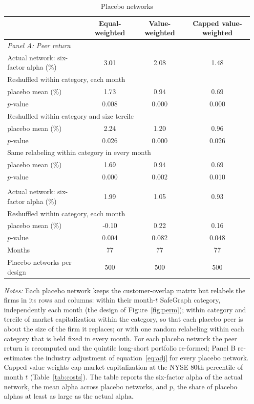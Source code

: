 \begin{table}[!htbp]\centering
\caption{Placebo networks}\label{tab:placebo}
\footnotesize
\begin{tabular*}{\linewidth}{@{\extracolsep{\fill}}lccc}
\toprule
 & Equal-weighted & Value-weighted & Capped value-weighted \\
\midrule
\multicolumn{4}{l}{\emph{Panel A: Peer return}} \\
Actual network: six-factor alpha (\%) & 3.01 & 2.08 & 1.48 \\
\multicolumn{4}{l}{Reshuffled within category, each month} \\
\quad placebo mean (\%) & 1.73 & 0.94 & 0.69 \\
\quad $p$-value & 0.008 & 0.000 & 0.000 \\
\multicolumn{4}{l}{Reshuffled within category and size tercile} \\
\quad placebo mean (\%) & 2.24 & 1.20 & 0.96 \\
\quad $p$-value & 0.026 & 0.000 & 0.026 \\
\multicolumn{4}{l}{Same relabeling within category in every month} \\
\quad placebo mean (\%) & 1.69 & 0.94 & 0.69 \\
\quad $p$-value & 0.000 & 0.002 & 0.010 \\
\addlinespace
\multicolumn{4}{l}{\emph{Panel B: Industry-adjusted peer return}} \\
Actual network: six-factor alpha (\%) & 1.99 & 1.05 & 0.93 \\
\multicolumn{4}{l}{Reshuffled within category, each month} \\
\quad placebo mean (\%) & -0.10 & 0.22 & 0.16 \\
\quad $p$-value & 0.004 & 0.082 & 0.048 \\
\addlinespace
Months & 77 & 77 & 77 \\
Placebo networks per design & 500 & 500 & 500 \\
\bottomrule
\end{tabular*}
\par\vspace{4pt}\begin{minipage}{\linewidth}\scriptsize \emph{Notes:} Each placebo network keeps the customer-overlap matrix but relabels the firms in its rows and columns: within their month-$t$ SafeGraph category, independently each month (the design of Figure~\ref{fig:perm}); within category and tercile of market capitalization within the category, so that each placebo peer is about the size of the firm it replaces; or with one random relabeling within each category that is held fixed in every month. For each placebo network the peer return is recomputed and the quintile long-short portfolio re-formed; Panel B re-estimates the industry adjustment of equation~\eqref{eq:adj} for every placebo network. Capped value weights cap market capitalization at the NYSE 80th percentile of month $t$ (Table~\ref{tab:costs}). The table reports the six-factor alpha of the actual network, the mean alpha across placebo networks, and $p$, the share of placebo alphas at least as large as the actual alpha.\end{minipage}
\end{table}
